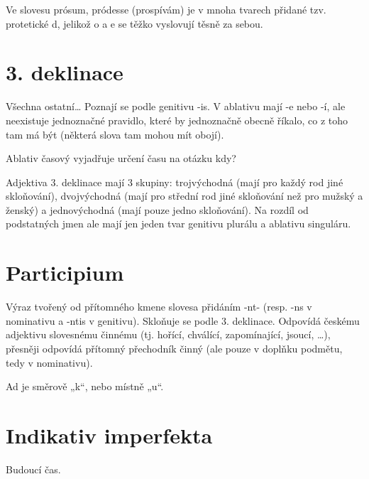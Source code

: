 \documentclass[12pt]{article}					%
\begin{document}
    Ve slovesu prósum, pródesse (prospívám) je v mnoha tvarech přidané tzv. protetické d, jelikož o a e se těžko vyslovují těsně za sebou.

\section{3. deklinace}
    Všechna ostatní… Poznají se podle genitivu -is. V ablativu mají -e nebo -í, ale neexistuje jednoznačné pravidlo, které by jednoznačně obecně říkalo, co z toho tam má být (některá slova tam mohou mít obojí).


    Ablativ časový vyjadřuje určení času na otázku kdy?

    Adjektiva 3. deklinace mají 3 skupiny: trojvýchodná (mají pro každý rod jiné skloňování), dvojvýchodná (mají pro střední rod jiné skloňování než pro mužský a ženský) a jednovýchodná (mají pouze jedno skloňování). Na rozdíl od podstatných jmen ale mají jen jeden tvar genitivu plurálu a ablativu singuláru.


\section{Participium}
    Výraz tvořený od přítomného kmene slovesa přidáním -nt- (resp. -ns v nominativu a -ntis v genitivu). Skloňuje se podle 3. deklinace. Odpovídá českému adjektivu slovesnému činnému (tj. hořící, chválící, zapomínající, jsoucí, …), přesněji odpovídá přítomný přechodník činný (ale pouze v doplňku podmětu, tedy v nominativu).


    Ad je směrově „k“, nebo místně „u“.

\section{Indikativ imperfekta}
    Budoucí čas.

\newpage
\end{document}
